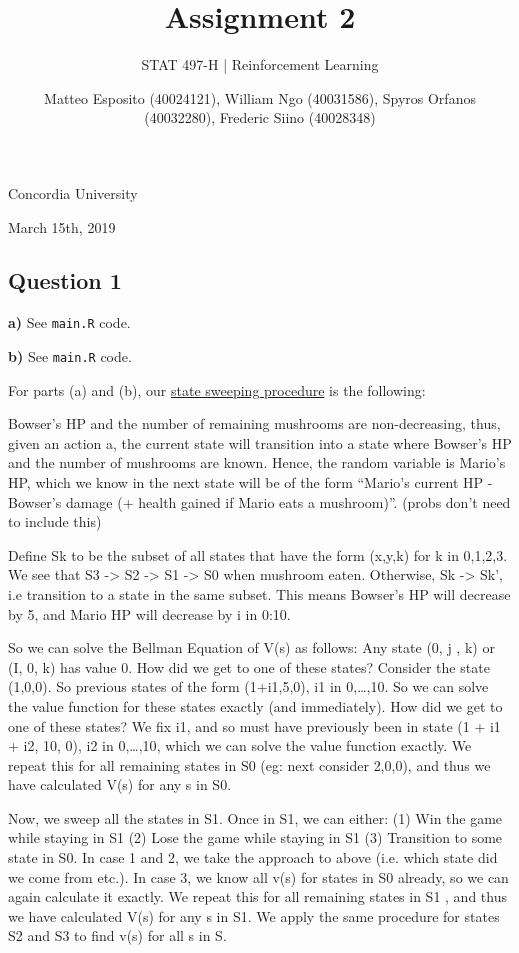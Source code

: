 \documentclass[a4paper,12pt]{article}
\title{\textbf{Assignment 2}}
\author{STAT 497-H | Reinforcement Learning}
\date{Matteo Esposito (40024121), William Ngo (40031586), Spyros Orfanos (40032280), Frederic Siino (40028348)}
\def\code#1{\texttt{#1}}
\begin{document}
\begin{titlingpage}
  \maketitle
  \centering
  \vfill
  {\large{Concordia University}}\par
  {\large{March 15th, 2019}}
\end{titlingpage}

\newpage

\subsection*{Question 1}

\textbf{a)} See \code{main.R} code.

\textbf{b)} See \code{main.R} code.

For parts (a) and (b), our \underline{state sweeping procedure} is the following: 

Bowser’s HP and the number of remaining mushrooms are non-decreasing, thus, given an action a, the current state will transition into a state where Bowser’s HP and the number of mushrooms are known. Hence, the random variable is Mario’s HP, which we know in the next state will be of the form “Mario’s current HP - Bowser’s damage (+ health gained if Mario eats a mushroom)”.  (probs don’t need to include this)

Define Sk to be the subset of all states that have the form (x,y,k) for k in 0,1,2,3. We see that S3 -> S2 -> S1 -> S0 when mushroom eaten. Otherwise, Sk -> Sk’, i.e transition to a state in the same subset. This means Bowser’s HP will decrease by 5, and Mario HP will decrease by i in 0:10. 

So we can solve the Bellman Equation of V(s) as follows: 
Any state (0, j , k) or (I, 0, k)  has value 0. How did we get to one of these states? Consider the state (1,0,0). So previous states of the form (1+i1,5,0), i1 in {0,…,10}. So we can solve the value function for these states exactly (and immediately). How did we get to one of these states? We fix i1, and so must have previously been in state (1 + i1 + i2, 10, 0), i2 in {0,…,10}, which we can solve the value function exactly. We repeat this for all remaining states in S0 (eg: next consider {2,0,0}), and thus we have calculated V(s) for any s in S0. 

Now, we sweep all the states in S1. Once in S1, we can either: (1) Win the game while staying in S1 (2) Lose the game while staying in S1 (3) Transition to some state in S0. In case 1 and 2, we take the approach to above (i.e. which state did we come from etc.). In case 3, we know all v(s) for states in S0 already, so we can again calculate it exactly. We repeat this for all remaining states in S1 , and thus we have calculated V(s) for any s in S1. We apply the same procedure for states S2 and S3 to find v(s) for all s in S.
\end{document}
